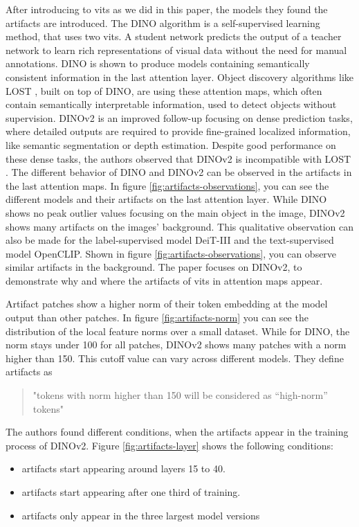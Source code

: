 \documentclass[conference]{IEEEtran}
\begin{document}
  After introducing to \acp{vit} as we did in this paper, the models they found the artifacts are introduced. The \mbox{DINO} algorithm is a self-supervised learning method, that uses two \acp{vit}. A student network predicts the output of a teacher network to learn rich representations of visual data without the need for manual annotations. \cite{dino} \mbox{DINO} is shown to produce models containing semantically consistent information in the last attention layer. Object discovery algorithms like \mbox{LOST} \cite{lost}, built on top of \mbox{DINO}, are using these attention maps, which often contain semantically interpretable information, used to detect objects without supervision. \mbox{DINOv2} \cite{dinov2} is an improved follow-up focusing on dense prediction tasks, where detailed outputs are required to provide fine-grained localized information, like semantic segmentation or depth estimation. Despite good performance on these dense tasks, the authors observed that \mbox{DINOv2} is incompatible with \mbox{LOST} \cite{registers}. The different behavior of \mbox{DINO} and \mbox{DINOv2} can be observed in the artifacts in the last attention maps. In figure \ref{fig:artifacts-observations}, you can see the different models and their artifacts on the last attention layer.
  While \mbox{DINO} shows no peak outlier values focusing on the main object in the image, \mbox{DINOv2} shows many artifacts on the images' background. This qualitative observation can also be made for the label-supervised model \mbox{DeiT-III} and the text-supervised model \mbox{OpenCLIP}. Shown in figure \ref{fig:artifacts-observations}, you can observe similar artifacts in the background.
  The paper focuses on \mbox{DINOv2}, to demonstrate why and where the artifacts of \acp{vit} in attention maps appear.

  Artifact patches show a higher norm of their token embedding at the  model output than other patches. In figure \ref{fig:artifacts-norm} you can see the distribution of the local feature norms over a small dataset. While for \mbox{DINO}, the norm stays under 100 for all patches, \mbox{DINOv2} shows many patches with a norm higher than 150. This cutoff value can vary across different models. They define artifacts as
  \begin{quote}
   "tokens with norm higher than 150 will be considered as “high-norm” tokens" \cite{registers}
  \end{quote}
  
  The authors found different conditions, when the artifacts appear in the training process of \mbox{DINOv2}. Figure \ref{fig:artifacts-layer} shows the following conditions:
  \begin{itemize}
    \item artifacts start appearing around layers 15 to 40.
    \item artifacts start appearing after one third of training.
    \item artifacts only appear in the three largest model versions
  \end{itemize}
\end{document}
